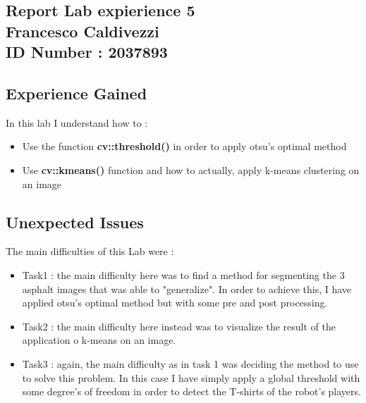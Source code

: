 \documentclass{article}
\begin{document}
\begin{flushleft}
\section*{Report Lab expierience 5\\ Francesco Caldivezzi \\ ID Number : 2037893}

\subsection*{Experience Gained}
In this lab I understand how to :
\begin{itemize}
  \item Use the function \textbf{cv::threshold()} in order to apply otsu's optimal method 
  \item Use \textbf{cv::kmeans()} function and how to actually, apply k-means clustering on an image
\end{itemize}

\newpage
\subsection*{Unexpected Issues}
The main difficulties of this Lab were :
\begin{itemize}
  \item Task1 : the main difficulty here was to find a method for segmenting the 3 asphalt images that was able to "generalize". In order to achieve this, I have applied otsu's optimal method but with some pre and post processing.
  \item Task2 : the main difficulty here instead was to visualize the result of the application o k-means on an image.
  \item Task3 : again, the main difficulty as in task 1 was deciding the method to use to solve this problem. In this case I have simply apply a global threshold with some degree's of freedom in order to detect the T-shirts of the robot's players.
\end{itemize}

\newpage

\end{flushleft}
\end{document}
